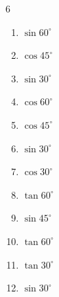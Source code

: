 \begin{multicols}{6}
\begin{enumerate}

  \item $\displaystyle \sin{60^\circ}$


  \item $\displaystyle \cos{45^\circ}$


  \item $\displaystyle \sin{30^\circ}$


  \item $\displaystyle \cos{60^\circ}$


  \item $\displaystyle \cos{45^\circ}$


  \item $\displaystyle \sin{30^\circ}$


  \item $\displaystyle \cos{30^\circ}$


  \item $\displaystyle \tan{60^\circ}$


  \item $\displaystyle \sin{45^\circ}$


  \item $\displaystyle \tan{60^\circ}$


  \item $\displaystyle \tan{30^\circ}$


  \item $\displaystyle \sin{30^\circ}$



\end{enumerate}
\end{multicols}
